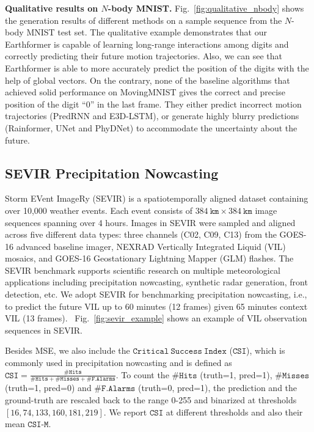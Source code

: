 \documentclass{article}
\newcommand{\figref}[1]{Fig.~\ref{#1}}
\renewcommand{\paragraph}[1]{\textbf{#1. }}
\def\nbody{$N$-body MNIST}
\begin{document}
\paragraph{Qualitative results on \nbody{}}
\figref{fig:qualitative_nbody} shows the generation results of different methods on a sample sequence from the \nbody{} test set.
The qualitative example demonstrates that our Earthformer is capable of learning long-range interactions among digits and correctly predicting their future motion trajectories. Also, we can see that Earthformer is able to more accurately predict the position of the digits with the help of global vectors.
On the contrary, none of the baseline algorithms that achieved solid performance on MovingMNIST gives the correct and precise position of the digit ``0'' in the last frame.
They either predict incorrect motion trajectories (PredRNN and E3D-LSTM), or generate highly blurry predictions (Rainformer, UNet and PhyDNet) to accommodate the uncertainty about the future.


\subsection{SEVIR Precipitation Nowcasting}
\label{sec:exp_sevir}
Storm EVent ImageRy (SEVIR) \cite{veillette2020sevir} is a spatiotemporally aligned dataset containing over 10,000 weather events. Each event consists of $384\ \mathtt{km}\times384\ \mathtt{km}$ image sequences spanning over 4 hours. Images in SEVIR were sampled and aligned across five different data types: three channels (C02, C09, C13) from the GOES-16 advanced baseline imager, NEXRAD Vertically Integrated Liquid (VIL) mosaics, and GOES-16 Geostationary Lightning Mapper (GLM) flashes. 
The SEVIR benchmark supports scientific research on multiple meteorological applications including precipitation nowcasting, synthetic radar generation, front detection, etc. We adopt SEVIR for benchmarking precipitation nowcasting, i.e., to predict the future VIL up to 60 minutes (12 frames) given 65 minutes context VIL (13 frames). ~\figref{fig:sevir_example} shows an example of VIL observation sequences in SEVIR.

Besides MSE, we also include the $\mathtt{Critical\ Success\ Index}$ ($\mathtt{CSI}$), which is commonly used in precipitation nowcasting and is defined as $\mathtt{CSI} = \frac{\mathtt{\#Hits}}{\mathtt{\#Hits}+\mathtt{\#Misses}+\mathtt{\#F.Alarms}}$. To count the $\mathtt{\#Hits}$ (truth=1, pred=1), $\mathtt{\#Misses}$ (truth=1, pred=0) and $\mathtt{\#F.Alarms}$ (truth=0, pred=1), 
the prediction and the ground-truth are rescaled back to the range 0-255 and binarized at thresholds $[16, 74, 133, 160, 181, 219]$. 
We report $\mathtt{CSI}$ at different thresholds and also their mean $\mathtt{CSI}\mbox{-}\mathtt{M}$.
\end{document}
